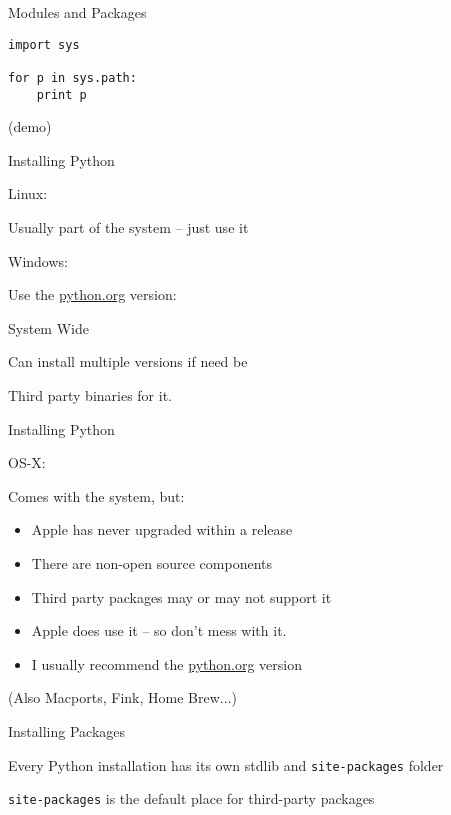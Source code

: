 \documentclass{beamer}
\begin{document}
\begin{frame}[fragile]{Modules and Packages}

\vfill
\begin{verbatim}
import sys

for p in sys.path:
    print p

\end{verbatim}

\vfill
(demo)
\end{frame} 

\begin{frame}[fragile]{Installing Python}

{\Large Linux:}

Usually part of the system -- just use it

\vfill
{\Large Windows:}

\vfill
Use the \url{python.org} version:

\vfill
System Wide

\vfill
Can install multiple versions if need be

\vfill
Third party binaries for it.

\end{frame} 

\begin{frame}[fragile]{Installing Python}

{\Large OS-X:}

Comes with the system, but:
\begin{itemize}
    \item Apple has never upgraded within a release
    \item There are non-open source components
    \item Third party packages may or may not support it
    \item Apple does use it -- so don't mess with it.
    \item I usually recommend the \url{python.org} version
\end{itemize}
(Also Macports, Fink, Home Brew...)

\vfill
\end{frame} 

\begin{frame}[fragile]{Installing Packages}

{\Large Every Python installation has its own stdlib and \verb|site-packages| folder}

\vfill
{\Large\verb|site-packages| is the default place for third-party packages}

\end{frame} 
\end{document}

